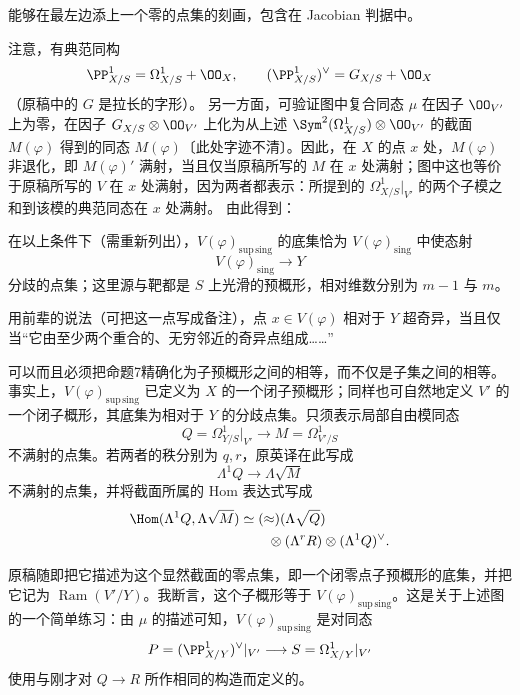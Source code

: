 能够在最左边添上一个零的点集的刻画，包含在 Jacobian 判据中。

注意，有典范同构
\[
 \PP^1_{X/S}=\Omega^1_{X/S}+\OO_X,
 \qquad (\PP^1_{X/S})^\vee=G_{X/S}+\OO_X
\]
（原稿中的 $G$ 是拉长的字形）。
另一方面，可验证图中复合同态 $\mu$ 在因子 $\OO_{V'}$ 上为零，在因子 $G_{X/S}\otimes\OO_{V'}$ 上化为从上述 $\Sym^2(\Omega^1_{X/S})\otimes\OO_{V'}$ 的截面 $M(\varphi)$ 得到的同态 $M(\varphi)$〔此处字迹不清〕。因此，在 $X$ 的点 $x$ 处，$M(\varphi)$ 非退化，即 $M(\varphi)'$ 满射，当且仅当原稿所写的 $M$ 在 $x$ 处满射；图中这也等价于原稿所写的 $V$ 在 $x$ 处满射，因为两者都表示：所提到的 $\Omega^1_{X/S}|_{V'}$ 的两个子模之和到该模的典范同态在 $x$ 处满射。
由此得到：

在以上条件下（需重新列出），$V(\varphi)_{\mathrm{sup\,sing}}$ 的底集恰为 $V(\varphi)_{\mathrm{sing}}$ 中使态射
\[
 V(\varphi)_{\mathrm{sing}}\longrightarrow Y
\]
分歧的点集；这里源与靶都是 $S$ 上光滑的预概形，相对维数分别为 $m-1$ 与 $m$。

用前辈的说法（可把这一点写成备注），点 $x\in V(\varphi)$ 相对于 $Y$ 超奇异，当且仅当“它由至少两个重合的、无穷邻近的奇异点组成……”

可以而且必须把命题7精确化为子预概形之间的相等，而不仅是子集之间的相等。事实上，$V(\varphi)_{\mathrm{sup\,sing}}$ 已定义为 $X$ 的一个闭子预概形；同样也可自然地定义 $V'$ 的一个闭子概形，其底集为相对于 $Y$ 的分歧点集。只须表示局部自由模同态
\[
 Q=\Omega^1_{Y/S}|_{V'}\longrightarrow M=\Omega^1_{V'/S}
\]
不满射的点集。若两者的秩分别为 $q,r$，原英译在此写成
\[
 \Lambda^1Q\longrightarrow\Lambda\sqrt M
\]
不满射的点集，并将截面所属的 Hom 表达式写成
\[
\begin{split}
 \Hom(\Lambda^1Q,\Lambda\sqrt M)
 &\simeq(\approx)(\Lambda\sqrt Q)\\
 &\qquad\otimes(\Lambda^rR)\otimes(\Lambda^1Q)^\vee.
\end{split}
\]

原稿随即把它描述为这个显然截面的零点集，即一个闭零点子预概形的底集，并把它记为 $\operatorname{Ram}(V'/Y)$。我断言，这个子概形等于 $V(\varphi)_{\mathrm{sup\,sing}}$。这是关于上述图的一个简单练习：由 $\mu$ 的描述可知，$V(\varphi)_{\mathrm{sup\,sing}}$ 是对同态
\[
 P=(\PP^1_{X/Y})^\vee|_{V'}\longrightarrow
 S=\Omega^1_{X/Y}|_{V'}
\]
使用与刚才对 $Q\to R$ 所作相同的构造而定义的。

